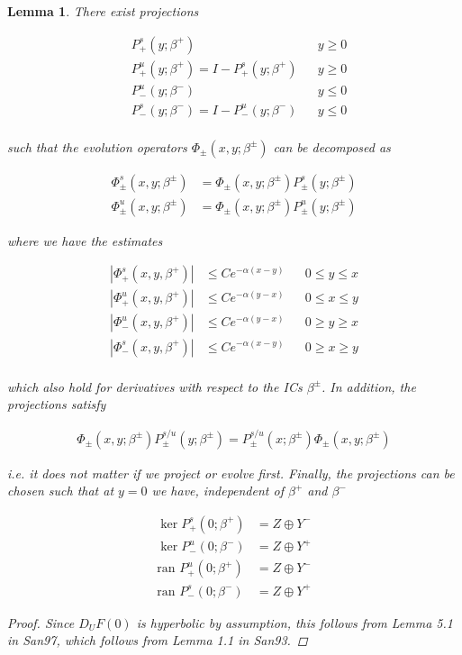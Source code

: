 \documentclass[12pt]{article}
\newtheorem{lemma}{Lemma}
\begin{document}
\begin{lemma}\label{dichotomy1}
There exist projections

\begin{align*}
&P_+^s(y; \beta^+) && y \geq 0 \\
&P_+^u(y; \beta^+) = I - P_+^s(y; \beta^+) && y \geq 0 \\
&P_-^u(y; \beta^-) && y \leq 0 \\
&P_-^s(y; \beta^-) = I - P_-^u(y; \beta^-) && y \leq 0 \\
\end{align*}

such that the evolution operators $\Phi_\pm(x, y; \beta^\pm)$ can be decomposed as

\begin{align*}
\Phi^s_\pm(x, y; \beta^\pm) &= \Phi_\pm(x, y; \beta^\pm) P^s_\pm(y; \beta^\pm) \\
\Phi^u_\pm(x, y; \beta^\pm) &= \Phi_\pm(x, y; \beta^\pm) P^u_\pm(y; \beta^\pm) 
\end{align*}

where we have the estimates

\begin{align*}
|\Phi^s_+(x, y, \beta^+)| &\leq C e^{-\alpha(x - y)} && 0 \leq y \leq x \\
|\Phi^u_+(x, y, \beta^+)| &\leq C e^{-\alpha(y - x)} && 0 \leq x \leq y \\
|\Phi^u_-(x, y, \beta^+)| &\leq C e^{-\alpha(y - x)} && 0 \geq y \geq x \\
|\Phi^s_-(x, y, \beta^+)| &\leq C e^{-\alpha(x - y)} && 0 \geq x \geq y \\
\end{align*}

which also hold for derivatives with respect to the ICs $\beta^\pm$. In addition, the projections satisfy 

\begin{align*}
\Phi_\pm(x, y; \beta^\pm) P^{s/u}_\pm(y; \beta^\pm) 
= P^{s/u}_\pm(x; \beta^\pm) \Phi_\pm(x, y; \beta^\pm)
\end{align*}

i.e. it does not matter if we project or evolve first. Finally, the projections can be chosen such that at $y = 0$ we have, independent of $\beta^+$ and $\beta^-$

\begin{align*}
\ker P^s_+(0; \beta^+) &= Z \oplus Y^- \\
\ker P^u_-(0; \beta^-) &= Z \oplus Y^+ \\
\textrm{ran } P^u_+(0; \beta^+) &= Z \oplus Y^- \\
\textrm{ran } P^s_-(0; \beta^-) &= Z \oplus Y^+
\end{align*}

\begin{proof}
Since $D_U F(0)$ is hyperbolic by assumption, this follows from Lemma 5.1 in San97, which follows from Lemma 1.1 in San93.
\end{proof}

\end{lemma}
\end{document}
